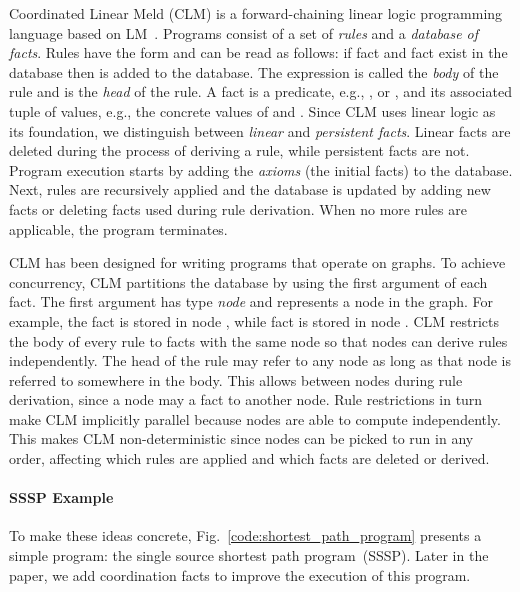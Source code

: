 Coordinated Linear Meld (CLM) is a forward-chaining linear logic programming
language based on LM~\cite{cruz-iclp14}.
Programs consist of a set of \emph{rules} and a \emph{database of facts}.
Rules have the form  and can be read as follows: if fact 
and fact  exist in the database then  is added to
the database. The expression  is called the \emph{body} of
the rule and  is the \emph{head} of the rule.
A fact is a predicate, e.g., ,  or , and its
associated tuple of values, e.g., the concrete values of  and
. Since CLM uses linear logic as its foundation, we distinguish between
\emph{linear} and \emph{persistent facts}. Linear facts are deleted during the
process of deriving a rule, while persistent facts are not.
Program execution starts by adding the \emph{axioms} (the initial facts)
to the database. Next, rules are recursively applied and the
database is updated by adding new facts or deleting facts used during rule derivation.
When no more rules are applicable, the program terminates.

CLM has been designed for writing programs that operate on graphs. To achieve
concurrency, CLM partitions the database by using the first argument of each fact. The first argument has
type \emph{node} and represents a node in the graph. For example,
the fact  is stored in node , while
fact  is stored in node . CLM restricts the body of
every rule to facts with the same node so that nodes can derive rules
independently. The head of the rule may refer
to any node as long as that node is referred to somewhere in the body. This allows
 between nodes during rule derivation, since a node may
 a fact to another node.  Rule restrictions in turn make CLM
implicitly parallel because nodes are able to compute independently. This makes
CLM non-deterministic since nodes can be picked to run in any order, affecting
which rules are applied and which facts are deleted or derived.

\paragraph{SSSP Example}\label{sect:ssspex}
To make these ideas concrete, Fig.~\ref{code:shortest_path_program} presents
a simple program: the single source shortest path program~(SSSP). Later in the paper, we
add coordination facts to improve the execution of this program.

